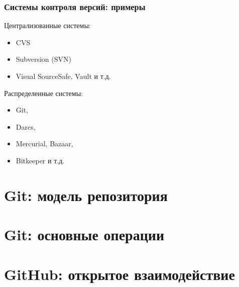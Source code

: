 \documentclass{beamer}
\begin{document}
\begin{frame}
  \frametitle{Системы контроля версий: примеры}
  Централизованные системы:
  \begin{itemize}
    \item CVS
    \item Subversion (SVN)
    \item Visual SourceSafe, Vault и т.д.
  \end{itemize}

  Распределенные системы:
  \begin{itemize}
    \item Git,
    \item Darcs,
    \item Mercurial, Bazaar,
    \item Bitkeeper и т.д.
  \end{itemize}
\end{frame}

\section{Git: модель репозитория}

\section{Git: основные операции}

\section{GitHub: открытое взаимодействие}
\end{document}
